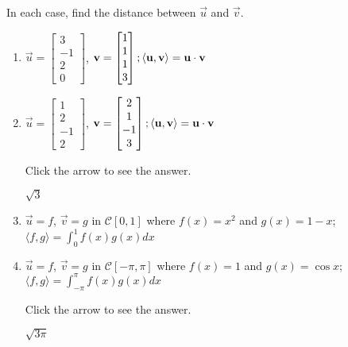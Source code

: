 \documentclass{ximera}
\begin{document}
\begin{problem}\label{prob:inner_prod_4}
In each case, find the distance between $\vec{u}$ and $\vec{v}$.

\begin{enumerate} 
\item $\vec{u} = \begin{bmatrix}3\\ -1\\ 2\\ 0\end{bmatrix}$, $\mathbf{v} = \begin{bmatrix}1\\ 1\\ 1\\ 3\end{bmatrix};
\langle \mathbf{u}, \mathbf{v} \rangle = \mathbf{u} \cdot \mathbf{v}$

\item $\vec{u} = \begin{bmatrix}1\\  2\\ -1\\ 2\end{bmatrix}$, $\mathbf{v} = \begin{bmatrix}2\\ 1\\ -1\\ 3\end{bmatrix};
\langle \mathbf{u}, \mathbf{v} \rangle = \mathbf{u} \cdot \mathbf{v}$

Click the arrow to see the answer.
\begin{expandable}{}{}
$\sqrt{3}$
\end{expandable}

\item $\vec{u} = f$, $\vec{v} = g $ in $\mathcal{C}[0, 1]$ where $f(x) = x^2 $ and $g(x) = 1 - x$; $\langle f, g \rangle = \int_{0}^{1} f(x)g(x)dx$

\item $\vec{u} = f$, $\vec{v} = g $ in $\mathcal{C}[-\pi, \pi]$ where $f(x) = 1$ and $g(x) = \cos x$; $\langle f, g \rangle = \int_{-\pi}^{\pi} f(x)g(x)dx$

Click the arrow to see the answer.
\begin{expandable}{}{}
$\sqrt{3\pi}$
\end{expandable}

\end{enumerate}
\end{problem}
\end{document}
